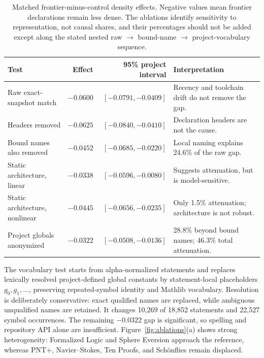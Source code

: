\documentclass[10pt]{article}
\begin{document}
\begin{table}[!htbp]
\centering
\small
\begin{tabular}{p{}rrp{}}
\toprule
Test & Effect & 95\% project interval & Interpretation \\
\midrule
Raw exact-snapshot match & $-0.0600$ & $[-0.0791,-0.0409]$ & Recency and toolchain drift do not remove the gap. \\
Headers removed & $-0.0625$ & $[-0.0840,-0.0410]$ & Declaration headers are not the cause. \\
Bound names also removed & $-0.0452$ & $[-0.0685,-0.0220]$ & Local naming explains 24.6\% of the raw gap. \\
Static architecture, linear & $-0.0338$ & $[-0.0596,-0.0080]$ & Suggests attenuation, but is model-sensitive. \\
Static architecture, nonlinear & $-0.0445$ & $[-0.0656,-0.0235]$ & Only 1.5\% attenuation; architecture is not robust. \\
Project globals anonymized & $-0.0322$ & $[-0.0508,-0.0136]$ & 28.8\% beyond bound names; 46.3\% total attenuation. \\
\bottomrule
\end{tabular}
\caption{Matched frontier-minus-control density effects.  Negative values mean
frontier declarations remain less dense.  The ablations identify sensitivity
to representation, not causal shares, and their percentages should not be
added except along the stated nested raw $\rightarrow$ bound-name
$\rightarrow$ project-vocabulary sequence.}
\label{tab:controls}
\end{table}

The vocabulary test starts from alpha-normalized statements and replaces
lexically resolved project-defined global constants by statement-local
placeholders $g_0,g_1,\ldots$, preserving repeated-symbol identity and Mathlib
vocabulary.  Resolution is deliberately conservative: exact qualified names
are replaced, while ambiguous unqualified names are retained.  It changes
10,269 of 18,852 statements and 22,527 symbol occurrences.  The remaining
$-0.0322$ gap is significant, so spelling and repository API alone are
insufficient.  Figure~\ref{fig:ablations}(a) shows strong heterogeneity:
Formalized Logic and Sphere Eversion approach the reference, whereas PNT+,
Navier--Stokes, Ten Proofs, and Sch\"onflies remain displaced.
\end{document}
